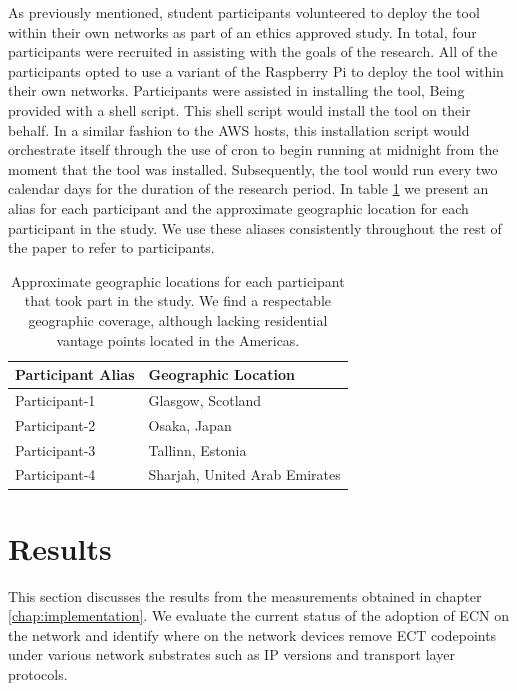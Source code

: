 \documentclass{l4proj}
\begin{document}
As previously mentioned, student participants volunteered to deploy the tool within their own networks as part of an ethics approved study. In total, four participants were recruited in assisting with the goals of the research. All of the participants opted to use a variant of the Raspberry Pi to deploy the tool within their own networks. Participants were assisted in installing the tool, Being provided with a shell script.  This shell script would install the tool on their behalf. In a similar fashion to the AWS hosts, this installation script would orchestrate itself through the use of cron to begin running at midnight from the moment that the tool was installed. Subsequently, the tool would run every two calendar days for the duration of the research period. In table \ref{table:participants} we present an alias for each participant and the approximate geographic location for each participant in the study. We use these aliases consistently throughout the rest of the paper to refer to participants.


\begin{table}[H]
\centering
\begin{tabular}{|l|l|}
\hline
\textbf{Participant Alias} & \textbf{Geographic Location}    \\ \hline
Participant-1     & Glasgow, Scotland      \\ \hline
Participant-2     & Osaka, Japan                \\ \hline
Participant-3     & Tallinn, Estonia              \\ \hline
Participant-4     & Sharjah, United Arab Emirates \\ \hline
\end{tabular}
\label{table:participants}
\caption{Approximate geographic locations for each participant that took part in the study. We find a respectable geographic coverage, although lacking residential vantage points located in the Americas.}
\end{table}

\chapter{Results} 

This section discusses the results from the measurements obtained in chapter \ref{chap:implementation}. We evaluate the current status of the adoption of ECN on the network and identify where on the network devices remove ECT codepoints under various network substrates such as IP versions and transport layer protocols.
\end{document}
